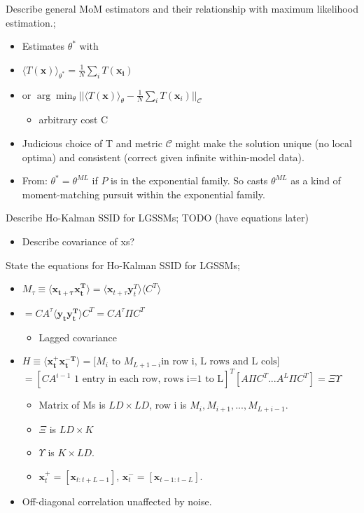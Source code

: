 \documentclass{article}
\begin{document}

Describe general MoM estimators and their relationship with maximum likelihood estimation.; \begin{itemize} \item Estimates $\theta^*$ with \item $\langle T(\mathbf{x}) \rangle_{\theta^*} = \frac{1}{N}\sum_i T(\mathbf{x_i})$ \item or $\arg\min_\theta ||\langle T(\mathbf{x})\rangle_\theta - \frac{1}{N}\sum_i T(\mathbf{x}_i)||_\mathcal{C}$ \begin{itemize} \item arbitrary cost C \end{itemize} \item Judicious choice of T and metric $\mathcal{C}$ might make the solution unique (no local optima) and consistent (correct given infinite within-model data). \item From: $\theta^*=\theta^{ML}$ if $P$ is in the exponential family. So casts $\theta^{ML}$ as a kind of moment-matching pursuit within the exponential family. \end{itemize}

Describe Ho-Kalman SSID for LGSSMs; TODO (have equations later) \begin{itemize} \item Describe covariance of xs? \end{itemize} 

State the equations for Ho-Kalman SSID for LGSSMs; \begin{itemize} \item $M_\tau \equiv \langle \mathbf{x_{t+\tau}x^T_t}\rangle =\langle \mathbf{x}_{t+\tau}\mathbf{y}^T_t\rangle \langle C^T\rangle$ \item $=CA^\tau \langle \mathbf{y_ty_t^T}\rangle C^T=CA^\tau \Pi C^T$ \begin{itemize} \item Lagged covariance \end{itemize} \item $H\equiv \langle \mathbf{x_t^+ x_t^{-T}}\rangle =\big [ M_i\text{ to }M_{L+1-i}\text{in row i, L rows and L cols} \big]$ $= [CA^{i-1} \text{ 1 entry in each row, rows i=1 to L}]^T [A\Pi C^T...A^L\Pi C^T] = \Xi\Upsilon$ \begin{itemize} \item Matrix of Ms is $LD\times LD$, row i is $M_i, M_{i+1},...,M_{L+i-1}$. \item $\Xi$ is $LD\times K$ \item $\Upsilon$ is $K\times LD$. \item $\mathbf{x}^+_t = [\mathbf{x}_{t:t+L-1}]$, $\mathbf{x}_t^- = [\mathbf{x}_{t-1:t-L}]$. \end{itemize} \item Off-diagonal correlation unaffected by noise. \end{itemize}
\end{document}
